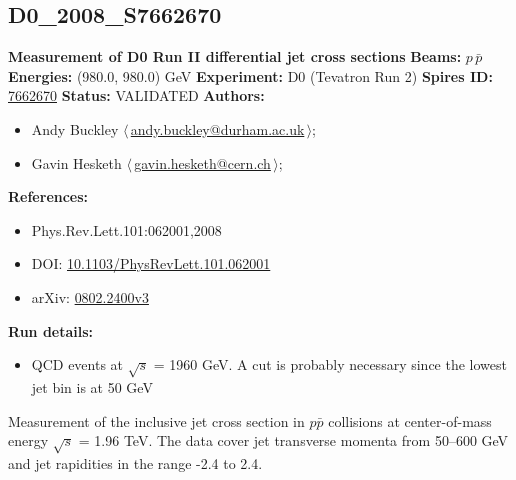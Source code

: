 \subsection[D0\_2008\_S7662670]{D0\_2008\_S7662670\,\cite{:2008hua}}
\textbf{Measurement of D0 Run II differential jet cross sections}\newline
\textbf{Beams:} $p$\,$\bar{p}$ \newline
\textbf{Energies:} (980.0, 980.0) GeV \newline
\textbf{Experiment:} D0 (Tevatron Run 2) \newline
\textbf{Spires ID:} \href{http://www.slac.stanford.edu/spires/find/hep/www?rawcmd=key+7662670}{7662670}\newline
\textbf{Status:} VALIDATED\newline
\textbf{Authors:}
\begin{itemize}
  \item Andy Buckley $\langle\,$\href{mailto:andy.buckley@durham.ac.uk}{andy.buckley@durham.ac.uk}$\,\rangle$;
  \item Gavin Hesketh $\langle\,$\href{mailto:gavin.hesketh@cern.ch}{gavin.hesketh@cern.ch}$\,\rangle$;
\end{itemize}
\textbf{References:}
\begin{itemize}
  \item Phys.Rev.Lett.101:062001,2008
  \item DOI: \href{http://dx.doi.org/10.1103/PhysRevLett.101.062001}{10.1103/PhysRevLett.101.062001}
  \item arXiv: \href{http://arxiv.org/abs/0802.2400v3}{0802.2400v3}
\end{itemize}
\textbf{Run details:}
\begin{itemize}

  \item QCD events at \ensuremath{\sqrt{s}} = 1960 GeV. A \pTmin cut is probably necessary since the lowest jet \pT bin is at 50 GeV\end{itemize}

\noindent Measurement of the inclusive jet cross section in $p \bar{p}$ collisions at center-of-mass energy \ensuremath{\sqrt{s}} = 1.96 TeV. The data cover jet transverse momenta from 50--600 GeV and jet rapidities in the range -2.4 to 2.4.

\clearpage


\clearpage

